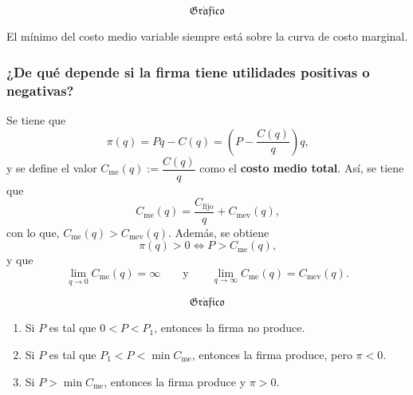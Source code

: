 \documentclass{report}
\newcommand{\GRAF}{\begin{center}$$\mathfrak{Gr\acute{a}fico}$$\end{center}}
\begin{document}
\GRAF

El mínimo del costo medio variable siempre está sobre la curva de costo marginal.

\subsubsection{¿De qué depende si la firma tiene utilidades positivas o negativas?}

Se tiene que
\[
\pi\!\left(q\right)=Pq-C\!\left(q\right)=\left(P-\frac{C\!\left(q\right)}{q}\right)q\text{,}
\]
y se define el valor $C_\text{me}\!\left(q\right):=\dfrac{C\!\left(q\right)}{q}$ como el \textbf{costo medio total}. Así, se tiene que
\[
C_\text{me}\!\left(q\right)=\frac{C_\text{fijo}}{q}+C_\text{mev}\!\left(q\right)\text{,}
\]
con lo que, $C_\text{me}\!\left(q\right)>C_\text{mev}\!\left(q\right)$. Además, se obtiene
\[
\pi\!\left(q\right)>0\Leftrightarrow P>C_\text{me}\!\left(q\right)\text{,}
\]
y que
\[
\lim_{q\to0}C_\text{me}\!\left(q\right)=\infty\qquad\text{y}\qquad\lim_{q\to\infty}C_\text{me}\!\left(q\right)=C_\text{mev}\!\left(q\right)\text{.}
\]

\GRAF

\begin{enumerate}
\item Si $P$ es tal que $0<P<P_1$, entonces la firma no produce.
\item Si $P$ es tal que $P_1<P<\min C_\text{me}$, entonces la firma produce, pero $\pi<0$.
\item Si $P>\min C_\text{me}$, entonces la firma produce y $\pi>0$.
\end{enumerate}













\end{document}
